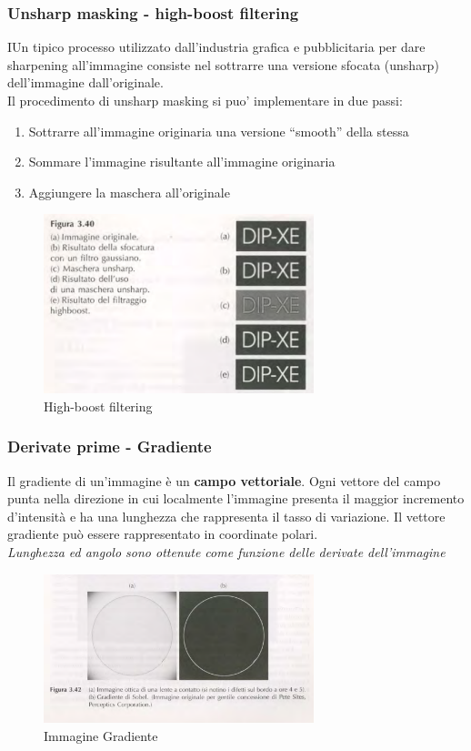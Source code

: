 \documentclass[12pt]{article}
\begin{document}
\subsubsection{Unsharp masking - high-boost filtering}
IUn tipico processo utilizzato dall'industria grafica e pubblicitaria per dare sharpening all'immagine consiste nel sottrarre una versione sfocata (unsharp) dell'immagine dall'originale.
\\Il procedimento di unsharp masking si puo’ implementare in due passi:
\begin{enumerate}
    \item Sottrarre all’immagine originaria una versione “smooth” della stessa
    \item Sommare l’immagine risultante all’immagine originaria
    \item Aggiungere la maschera all'originale
\end{enumerate}
\begin{figure}[!htb]
    \centering
    \includegraphics[width=0.7\textwidth]{Images/highboost.png}
    \caption{High-boost filtering}
\end{figure}
\FloatBarrier
\subsubsection{Derivate prime - Gradiente}
Il gradiente di un'immagine è un \textbf{campo vettoriale}. Ogni vettore del campo punta nella direzione in cui localmente l'immagine presenta il maggior incremento d'intensità e ha una lunghezza che rappresenta il tasso di variazione. Il vettore gradiente può essere rappresentato in coordinate polari.
\\\textit{Lunghezza ed angolo sono ottenute come funzione delle derivate dell'immagine}
\begin{figure}[!htb]
    \centering
    \includegraphics[width=0.7\textwidth]{Images/grad.png}
    \caption{Immagine Gradiente}
\end{figure}
\FloatBarrier
\end{document}
